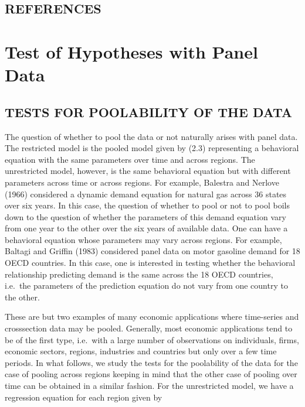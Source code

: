\documentclass[
]{book}
\begin{document}
\hypertarget{references}{%
\section{REFERENCES}\label{references}}

\hypertarget{test-of-hypotheses-with-panel-data}{%
\chapter{Test of Hypotheses with Panel Data}\label{test-of-hypotheses-with-panel-data}}

\hypertarget{tests-for-poolability-of-the-data}{%
\section{TESTS FOR POOLABILITY OF THE DATA}\label{tests-for-poolability-of-the-data}}

The question of whether to pool the data or not naturally arises with panel data. The restricted model is the pooled model given by (2.3) representing a behavioral equation with the same parameters over time and across regions. The unrestricted model, however, is the same behavioral equation but with different parameters across time or across regions. For example, Balestra and Nerlove (1966) considered a dynamic demand equation for natural gas across 36 states over six years. In this case, the question of whether to pool or not to pool boils down to the question of whether the parameters of this demand equation vary from one year to the other over the six years of available data. One can have a behavioral equation whose parameters may vary across regions. For example, Baltagi and Griffin (1983) considered panel data on motor gasoline demand for 18 OECD countries. In this case, one is interested in testing whether the behavioral relationship predicting demand is the same across the 18 OECD countries, i.e.~the parameters of the prediction equation do not vary from one country to the other.

These are but two examples of many economic applications where time-series and crosssection data may be pooled. Generally, most economic applications tend to be of the first type, i.e.~with a large number of observations on individuals, firms, economic sectors, regions, industries and countries but only over a few time periods. In what follows, we study the tests for the poolability of the data for the case of pooling across regions keeping in mind that the other case of pooling over time can be obtained in a similar fashion.
For the unrestricted model, we have a regression equation for each region given by
\end{document}

